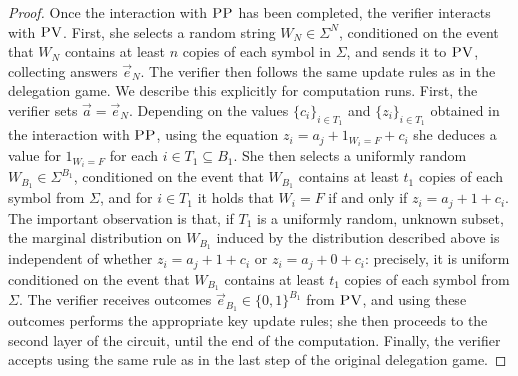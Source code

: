 \documentclass{toc}
\newcommand{\pv}{\textsc{PV}}
\newcommand{\pp}{\textsc{PP}}
\begin{document}
\begin{proof}
Once the interaction with $\pp$ has been completed, the verifier interacts with $\pv$. First, she selects a random string $W_N\in \Sigma^N$, conditioned on the event that $W_N$ contains at least $n$ copies of each symbol in $\Sigma$, and sends it to $\pv$, collecting answers $\vec{e}_N$. The verifier then follows the same update rules as in the delegation game. We describe this explicitly for computation runs. First, the verifier sets $\vec{a} = \vec{e}_N$. Depending on the values $\{c_i\}_{i\in T_1}$ and $\{z_i\}_{i\in T_1}$ obtained in the interaction with $\pp$, using the equation $z_i = a_j + 1_{W_i=F}+c_i$ she deduces a value for $1_{W_i=F}$ for each $i\in T_1 \subseteq B_1$. She then selects a uniformly random $W_{B_1} \in \Sigma^{B_1}$, conditioned on the event that $W_{B_1}$ contains at least $t_1$ copies of each symbol from $\Sigma$, and for $i\in T_1$ it holds that $W_i=F$ if and only if $z_i = a_j + 1+c_i$. The important observation is that, if $T_1$ is a uniformly random, unknown subset, the marginal distribution on $W_{B_1}$ induced by the distribution described above is independent of whether $z_i = a_j + 1+c_i$ or $z_i = a_j + 0 +c_i$: precisely, it is uniform conditioned on the event that $W_{B_1}$ contains at least $t_1$ copies of each symbol from $\Sigma$. 
The verifier receives outcomes $\vec{e}_{B_1}\in \{0,1\}^{B_1}$ from $\pv$, and using these outcomes performs the appropriate key update rules; she then proceeds to the second layer of the circuit, until the end of the computation. Finally, the verifier accepts using the same rule as in the last step of the original delegation game. 


\end{proof}
\end{document}
